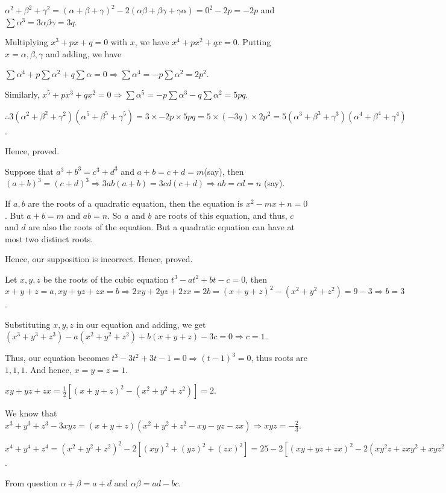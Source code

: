   $\alpha^2 + \beta^2 + \gamma^2 = (\alpha + \beta + \gamma)^2 - 2(\alpha\beta + \beta\gamma + \gamma\alpha)
  = 0^2 - 2p = -2p$ and $\sum\alpha^3 = 3\alpha\beta\gamma = 3q$.

  Multiplying $x^3 + px + q = 0$ with $x$, we have $x^4 + px^2 + qx = 0$. Putting $x = \alpha, \beta,
  \gamma$ and adding, we have

  $\sum\alpha^4 + p\sum\alpha^2 + q\sum\alpha = 0 \Rightarrow \sum\alpha^4 = -p\sum\alpha^2 = 2p^2$.

  Similarly, $x^5 + px^3 + qx^2 = 0 \Rightarrow \sum\alpha^5 = -p\sum\alpha^3 - q\sum\alpha^2 = 5pq$.

  $\therefore 3(\alpha^2 + \beta^2 + \gamma^2)(\alpha^5 + \beta^5 + \gamma^5) = 3\times-2p\times5pq =
  5\times(-3q)\times2p^2 = 5(\alpha^3 + \beta^3 + \gamma^3)(\alpha^4 + \beta^4 + \gamma^4)$.

  Hence, proved.
\item Suppose that $a^3 + b^3 = c^3 + d^3$ and $a + b = c + d = m$(say), then $(a + b)^3 = (c + d)^3
  \Rightarrow 3ab(a + b) = 3cd(c + d) \Rightarrow ab = cd = n$ (say).

  If $a, b$ are the roots of a quadratic equation, then the equation is $x^2 - mx + n = 0$. But $a + b = m$
  and $ab = n$. So $a$ and $b$ are roots of this equation, and thus, $c$ and $d$ are also the roots of the
  equation. But a quadratic equation can have at most two distinct roots.

  Hence, our supposition is incorrect. Hence, proved.
\item Let $x, y, z$ be the roots of the cubic equation $t^3 - at^2 + bt - c = 0$, then $x + y + z = a, xy +
  yz + zx = b \Rightarrow 2xy + 2yz + 2zx = 2b = (x + y + z)^2 - (x^2 + y^2 + z^2) = 9 - 3 \Rightarrow b =
  3$.

  Substituting $x, y, z$ in our equation and adding, we get $(x^3 + y^3 + z^3) - a(x^2 + y^2 + z^2) + b(x +
  y + z) -3c = 0 \Rightarrow c = 1$.

  Thus, our equation becomes $t^3 - 3t^2 + 3t - 1 = 0 \Rightarrow (t - 1)^3 = 0$, thus roots are $1, 1,
  1$. And hence, $x = y = z = 1$.
\item $xy + yz + zx = \frac{1}{2}[(x + y + z)^2 - (x^2 + y^2 + z^2)] = 2$.

  We know that $x^3 + y^3 + z^3 - 3xyz = (x + y + z)(x^2 + y^2 + z^2 - xy - yz - zx)\Rightarrow xyz =
  -\frac{2}{3}$.

  $x^4 + y^4 + z^4 = (x^2 + y^2 + z^2)^2 - 2[(xy)^2 + (yz)^2 + (zx)^2] = 25 - 2[(xy + yz + zx)^2 - 2(xy^2z +
    zxy^2 + xyz^2)] = 25 - 2[4 - 2xyz(x + y + z)] = 9$.
\item From question $\alpha + \beta = a + d$ and $\alpha\beta = ad - bc$.

